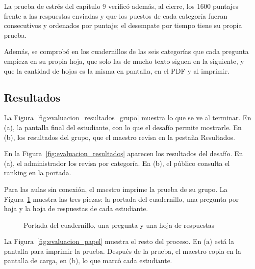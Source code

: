 La prueba de estrés del capítulo 9 verificó además, al cierre, los 1600 puntajes frente a las respuestas enviadas y que los puestos de cada categoría fueran consecutivos y ordenados por puntaje; el desempate por tiempo tiene su propia prueba.

Además, se comprobó en los cuadernillos de las seis categorías que cada pregunta empieza en su propia hoja, que solo las de mucho texto siguen en la siguiente, y que la cantidad de hojas es la misma en pantalla, en el PDF y al imprimir.

\subsection{Resultados}

La Figura~\ref{fig:evaluacion_resultados_grupo} muestra lo que se ve al terminar. En (a), la pantalla final del estudiante, con lo que el desafío permite mostrarle. En (b), los resultados del grupo, que el maestro revisa en la pestaña Resultados.


En la Figura~\ref{fig:evaluacion_resultados} aparecen los resultados del desafío. En (a), el administrador los revisa por categoría. En (b), el público consulta el ranking en la portada.


Para las aulas sin conexión, el maestro imprime la prueba de su grupo. La Figura~\ref{fig:evaluacion_papel_hojas} muestra las tres piezas: la portada del cuadernillo, una pregunta por hoja y la hoja de respuestas de cada estudiante.

\begin{figure}[htbp]
\centering
{}
\caption{Portada del cuadernillo, una pregunta y una hoja de respuestas}
\label{fig:evaluacion_papel_hojas}
\end{figure}

La Figura~\ref{fig:evaluacion_papel} muestra el resto del proceso. En (a) está la pantalla para imprimir la prueba. Después de la prueba, el maestro copia en la pantalla de carga, en (b), lo que marcó cada estudiante.

